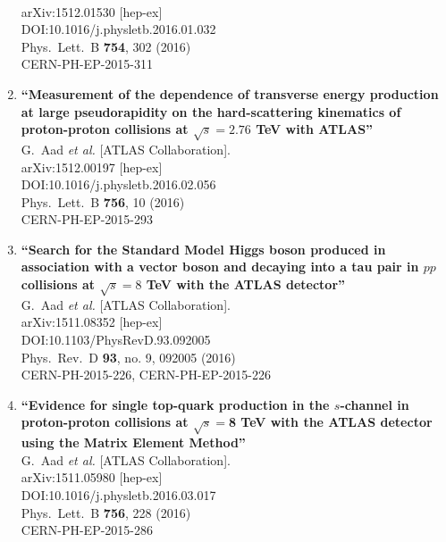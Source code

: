 \documentclass{article}
\begin{document}
\begin{enumerate}
  \\{}arXiv:1512.01530 [hep-ex]
  \\{}DOI:10.1016/j.physletb.2016.01.032
  \\{}Phys.\ Lett.\ B {\bf 754}, 302 (2016)
  \\{}CERN-PH-EP-2015-311
\item%
{\bf ``Measurement of the dependence of transverse energy production at large pseudorapidity on the hard-scattering kinematics of proton-proton collisions at $\sqrt{s} = 2.76$ TeV with ATLAS''}
  \\{}G.~Aad {\it et al.} [ATLAS Collaboration].
  \\{}arXiv:1512.00197 [hep-ex]
  \\{}DOI:10.1016/j.physletb.2016.02.056
  \\{}Phys.\ Lett.\ B {\bf 756}, 10 (2016)
  \\{}CERN-PH-EP-2015-293
\item%
{\bf ``Search for the Standard Model Higgs boson produced in association with a vector boson and decaying into a tau pair in $pp$ collisions at $\sqrt{s} = 8$ TeV with the ATLAS detector''}
  \\{}G.~Aad {\it et al.} [ATLAS Collaboration].
  \\{}arXiv:1511.08352 [hep-ex]
  \\{}DOI:10.1103/PhysRevD.93.092005
  \\{}Phys.\ Rev.\ D {\bf 93}, no. 9, 092005 (2016)
  \\{}CERN-PH-2015-226, CERN-PH-EP-2015-226
\item%
{\bf ``Evidence for single top-quark production in the $s$-channel in proton-proton collisions at $\sqrt{s}=$8 TeV with the ATLAS detector using the Matrix Element Method''}
  \\{}G.~Aad {\it et al.} [ATLAS Collaboration].
  \\{}arXiv:1511.05980 [hep-ex]
  \\{}DOI:10.1016/j.physletb.2016.03.017
  \\{}Phys.\ Lett.\ B {\bf 756}, 228 (2016)
  \\{}CERN-PH-EP-2015-286

\end{enumerate}
\end{document}
